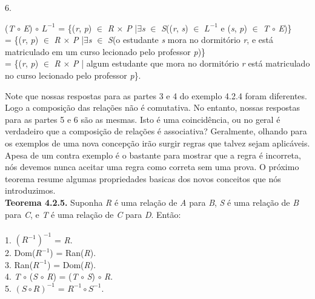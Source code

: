 6. 
\begin{center}
(\textit{T} $\circ$ \textit{E}) $\circ$ $\textit{L}^{-1}$ = \{(\textit{r}, \textit{p}) $\in$ \textit{R} $\times$ \textit{P} |$\exists$\textit{s} $\in$ \textit{S}((\textit{r}, \textit{s}) $\in$ $\textit{L}^{-1}$ e (\textit{s}, \textit{p}) $\in$ \textit{T} $\circ$ \textit{E})\}
\\
= \{(\textit{r}, \textit{p}) $\in$ \textit{R} $\times$ \textit{P} |$\exists$\textit{s} $\in$ \textit{S}(o estudante \textit{s} mora no dormitório \textit{r}, e está matriculado em um curso lecionado pelo professor \textit{p})\}
\\
= \{(\textit{r}, \textit{p}) $\in$ \textit{R} $\times$ \textit{P} | algum estudante que mora no dormitório \textit{r} está matriculado no curso lecionado pelo professor \textit{p}\}.
\end{center}

Note que nossas respostas para as partes 3 e 4 do exemplo 4.2.4 foram diferentes. Logo a composição das relações não é comutativa. No entanto, nossas respostas para as partes 5 e 6 são as mesmas. Isto é uma coincidência, ou no geral é verdadeiro que a composição de relações é associativa? Geralmente, olhando para os exemplos de uma nova concepção irão surgir regras que talvez sejam aplicáveis. Apesa de um contra exemplo é o bastante para mostrar que a regra é incorreta, nós devemos nunca aceitar uma regra como correta sem uma prova. O próximo teorema resume algumas propriedades basicas dos novos conceitos que nós introduzimos.
\\

\textbf{Teorema 4.2.5.} Suponha \textit{R} é uma relação de \textit{A} para \textit{B}, \textit{S} é uma relação de \textit{B} para \textit{C}, e \textit{T} é uma relação de \textit{C} para \textit{D}. Então:
\\
\\
1. $(\textit{R}^{-1})^{-1}$ = \textit{R}.
\\
2. Dom($\textit{R}^{-1}$) = Ran(\textit{R}).
\\
3. Ran($\textit{R}^{-1}$) = Dom(\textit{R}).
\\
4. \textit{T} $\circ$ (\textit{S} $\circ$ \textit{R}) = (\textit{T} $\circ$ \textit{S}) $\circ$ \textit{R}.
\\
5. $(\textit{S} \circ \textit{R})^{-1}$ = $\textit{R}^{-1} \circ \textit{S}^{-1}$.
\\

